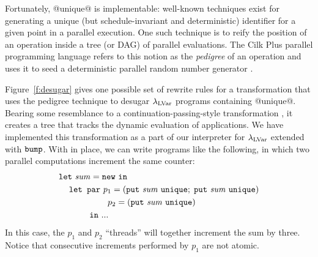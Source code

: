 Fortunately, @unique@ is implementable: well-known techniques exist for generating a unique (but
schedule-invariant and deterministic) identifier for a given point in
a parallel execution.
One such technique is to reify the position of an
operation inside a tree (or DAG) of parallel evaluations.  
The Cilk Plus parallel programming language 
refers to this notion as the {\em pedigree} of an operation and uses it to seed a
deterministic parallel random number generator \cite{cilk-dprng}.

Figure~\ref{f:desugar} gives one possible set of rewrite rules for a transformation that uses the pedigree technique to desugar $\lambda_{\textrm{LVar}}$ programs containing @unique@.  Bearing some resemblance to a continuation-passing-style transformation \cite{cps-citation}, it 
creates a tree that tracks the dynamic evaluation of
applications.
We have implemented this transformation as a part of our 
interpreter for $\lambda_{\textrm{LVar}}$ extended with $\mbox{\texttt{bump}}$.
With  in place, we can write programs like the following, in which two
parallel
computations increment the same counter:
\begin{equation*}
\begin{split}
& \letexp{\mathit{sum}}{\NEW}{ \\
& \letspace \LETPAR      ~p_1 = (\putexp{\mathit{sum}}{\termfont{unique}};\; \putexp{\mathit{sum}}{\termfont{unique}})\\
& \letspace \letparspace ~p_2 = (\putexp{\mathit{sum}}{\termfont{unique}})\\
& \letspace \letspace \letspace \IN~ ...
}
\end{split}
\end{equation*}
In this case, the $p_1$ and $p_2$ ``threads'' will together
increment the sum by three.  Notice that consecutive increments
performed by $p_1$ are not atomic.  


